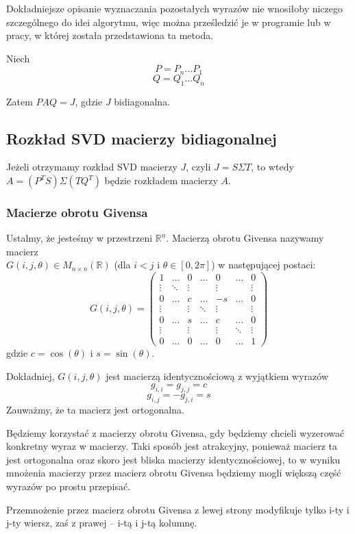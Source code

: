 \documentclass{article}
\theoremstyle{definition}
\begin{document}
Dokładniejsze opisanie wyznaczania pozostałych wyrazów nie wnosiłoby niczego szczególnego do idei algorytmu, więc można prześledzić je w programie lub w pracy, w której została przedstawiona ta metoda.

Niech
$$ P = P_n \ldots P_1 $$
$$ Q = Q_1 \ldots Q_n $$

Zatem $PAQ = J$, gdzie $J$ bidiagonalna.
\subsection{Rozkład SVD macierzy bidiagonalnej}
Jeżeli otrzymamy rozkład SVD macierzy $J$, czyli $J=S\Sigma T$, to wtedy $A = (P^T S)\Sigma (TQ^T) $ będzie rozkładem macierzy $A$.

\subsubsection{Macierze obrotu Givensa}
Ustalmy, że jesteśmy w przestrzeni $\mathbb{R}^n$. Macierzą obrotu Givensa nazywamy macierz \\$G(i,j,\theta) \in M_{n \times n}(\mathbb{R})$ (dla $i<j$ i $\theta \in [0,2\pi ]$) w następującej postaci:
$$ G(i,j,\theta) = \begin{pmatrix}
1 & \ldots & 0 & \ldots & 0 & \ldots & 0 \\
\vdots & \ddots & \vdots & & \vdots & & \vdots \\
0 & \ldots & c & \ldots & -s & \ldots & 0 \\
\vdots & & \vdots & \ddots & \vdots & & \vdots \\
0 & \ldots & s & \ldots & c & \ldots & 0 \\
\vdots & & \vdots & & \vdots & \ddots & \vdots \\
0 & \ldots & 0 & \ldots & 0 & \ldots & 1
\end{pmatrix} $$
gdzie $c = \cos( \theta)$ i $ s = \sin (\theta)$.

Dokładniej, $G(i,j,\theta)$ jest macierzą identycznościową z wyjątkiem wyrazów
$$ g_{i,i} = g_{j,j} = c $$
$$ g_{i,j} = -g_{j,i} = s $$
Zauważmy, że ta macierz jest ortogonalna. 

Będziemy korzystać z macierzy obrotu Givensa, gdy będziemy chcieli wyzerować konkretny wyraz w macierzy. Taki sposób jest atrakcyjny, ponieważ macierz ta jest ortogonalna oraz skoro jest bliska macierzy identycznościowej, to w wyniku mnożenia macierzy przez macierz obrotu Givensa będziemy mogli większą część wyrazów po prostu przepisać.

Przemnożenie przez macierz obrotu Givensa z lewej strony modyfikuje tylko i-ty i j-ty wiersz, zaś z prawej -- i-tą i j-tą kolumnę.
\end{document}
